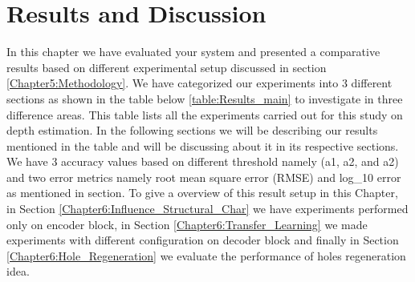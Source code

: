 

\chapter{Results and Discussion}

\label{Chapter6:Results}

 
 
In this chapter we have evaluated your system and presented a comparative results  based on different experimental setup discussed in section \ref{Chapter5:Methodology}. We have categorized our experiments into 3 different sections as shown in the table below \ref{table:Results_main} to investigate in three difference areas. This table lists all the experiments carried out for this study on depth estimation. In the following sections we will be describing our results mentioned in the table and will be discussing about it in its respective sections.  We have 3 accuracy values based on different threshold namely (a1, a2, and a2) and two error metrics namely root mean square error (RMSE) and log\_10 error as mentioned in section. To give a overview of this result setup in this Chapter, in Section \ref{Chapter6:Influence_Structural_Char} we have experiments performed only on encoder block, in Section \ref{Chapter6:Transfer_Learning}  we made experiments with different configuration on decoder block and finally in Section \ref{Chapter6:Hole_Regeneration} we evaluate the performance of holes regeneration idea. 

